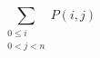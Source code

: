 \documentclass{book}
\begin{document}
\setcounter{chapter}{2}

\begin{equation}
\sum _{\substack{0 \le i \\ 0<j<n}} P(i,j)
\end{equation}
\end{document}
